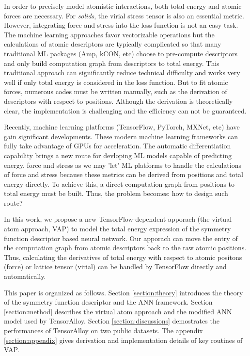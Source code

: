 \documentclass[final,1p,times]{elsarticle}
\begin{document}
In order to precisely model atomistic interactions, both total energy and atomic 
forces are necessary. For \textit{solids}, the virial stress tensor is also an
essential metric. However, integrating force and stress into the loss function 
is not an easy task. The machine learning approaches favor vectorizable 
operations but the calculations of atomic descriptors are typically complicated 
so that many traditional ML packages (Amp, kCON, etc) choose to pre-compute 
descriptors and only build computation graph from descriptors to total energy. 
This traditional approach can significantly reduce technical difficulty and 
works very well if only total energy is considered in the loss function. But to 
fit atomic forces, numerous codes must be written manually, such as the 
derivation of descriptors with respect to positions. Although the derivation is 
theoretically clear, the implementation is challenging and the efficiency can 
not be guaranteed.

Recently, machine learning platforms (TensorFlow\cite{tensorflow}, 
PyTorch\cite{pytorch}, MXNet\cite{MXNet}, etc) have gain significant 
developments. These modern machine learning frameworks can fully take advantage 
of GPUs for acceleration. The automatic differentiation capability brings a new 
route for devloping ML models capable of predicting energy, force and stress as 
we may 'let' ML platforms to handle the calculations of force and stress because 
these metrics can be derived from positions and total energy directly. To 
achieve this, a direct computation graph from positions to total energy must be
built. Thus, the problem becomes: how to design such route?

In this work, we propose a new TensorFlow-dependent apporach (the virtual atom 
approach, VAP) to model the total energy expression of the symmetry function 
descriptor based neural network. 
Our apporach can move the entry of the computation graph from atomic descriptors 
back to the raw atomic positions. Thus, calculating the derivatives of total 
energy with respect to atomic positons (force) or lattice tensor (virial) can be 
handled by TensorFlow directly and automatically. 

This paper is organized as follows. Section \ref{section:theory} introduces the 
theory of the symmetry function descriptor and the ANN framework. Section 
\ref{section:method} describes the virtual atom approach and the modified ANN 
model used by TensorAlloy. Section \ref{section:discussions} demostrates 
the performances of TensorAlloy on two public datasets. The appendix 
\ref{section:appendix} gives derivation and implementation details of key 
routines of VAP. 
\end{document}
